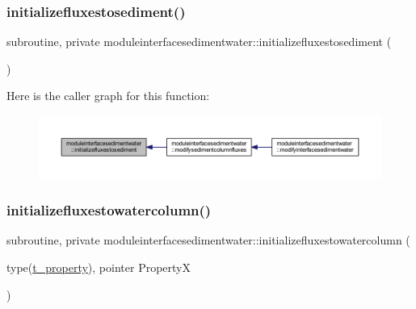 \subsubsection{\texorpdfstring{initializefluxestosediment()}{initializefluxestosediment()}}
{\footnotesize\ttfamily subroutine, private moduleinterfacesedimentwater\+::initializefluxestosediment (\begin{DoxyParamCaption}{ }\end{DoxyParamCaption})\hspace{0.3cm}{\ttfamily [private]}}

Here is the caller graph for this function\+:\nopagebreak
\begin{figure}[H]
\begin{center}
\leavevmode
\includegraphics[width=350pt]{namespacemoduleinterfacesedimentwater_a3daecfd36630da785ff12a9ea8c61064_icgraph}
\end{center}
\end{figure}
\mbox{\label{namespacemoduleinterfacesedimentwater_ad957168b604568b1c6165e52a78a03c6}} 
\subsubsection{\texorpdfstring{initializefluxestowatercolumn()}{initializefluxestowatercolumn()}}
{\footnotesize\ttfamily subroutine, private moduleinterfacesedimentwater\+::initializefluxestowatercolumn (\begin{DoxyParamCaption}\item[{type(\mbox{\hyperlink{structmoduleinterfacesedimentwater_1_1t__property}{t\+\_\+property}}), pointer}]{PropertyX }\end{DoxyParamCaption})\hspace{0.3cm}{\ttfamily [private]}}

